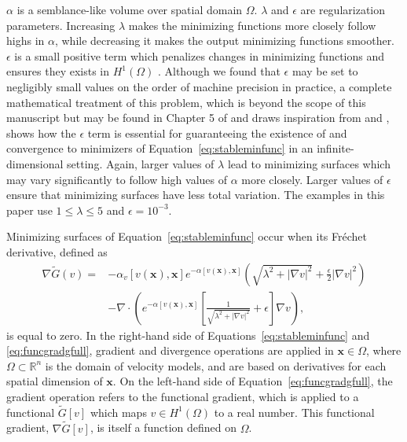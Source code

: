 $\alpha$ is a semblance-like volume over spatial domain $\Omega$.  $\lambda$ and $\epsilon$ are regularization parameters.  Increasing $\lambda$ makes the minimizing functions more closely follow highs in $\alpha$, while decreasing it makes the output minimizing functions smoother.  $\epsilon$ is a small positive term which penalizes changes in minimizing functions and ensures they exists in $H^1(\Omega)$ \cite[]{dobson-1997}.  Although we found that $\epsilon$ may be set to negligibly small values on the order of machine precision in practice, a complete mathematical treatment of this problem, which is beyond the scope of this manuscript but may be found in Chapter 5 of \cite{decker-dissertation} and draws inspiration from \cite{dacorogna2004introduction} and \cite{smyrlis-2004}, shows how the $\epsilon$ term is essential for guaranteeing the existence of and convergence to minimizers of  Equation~\ref{eq:stableminfunc} in an infinite-dimensional setting. Again, larger values of $\lambda$ lead to minimizing surfaces which may vary significantly to follow high values of $\alpha$ more closely. Larger values of $\epsilon$ ensure that minimizing surfaces have less total variation.  The examples in this paper use $1 \leq \lambda \leq 5$ and $\epsilon = 10^{-3}$. 

Minimizing surfaces of Equation~\ref{eq:stableminfunc} occur when its Fr\'{e}chet derivative, defined as
\begin{equation}
\label{eq:funcgradgfull}
\begin{split}
    \nabla \tilde{G}(v) =& -\alpha_v[v(\mathbf{x}),\mathbf{x}]e^{ -\alpha[v(\mathbf{x}),\mathbf{x}]}\left(\sqrt{\lambda^2+\left|\nabla v\right|^2}+\frac{\epsilon}{2}\left|\nabla v\right|^2 \right) \\
    &- \nabla \cdot \left(e^{-\alpha[v(\mathbf{x}),\mathbf{x}]}\left[\frac{1}{\sqrt{\lambda^2+\left|\nabla v\right|^2}}+\epsilon \right]\nabla v \right),
\end{split}
\end{equation}
is equal to zero. In the right-hand side of Equations~\ref{eq:stableminfunc} and \ref{eq:funcgradgfull}, gradient and divergence operations are applied in $\mathbf{x} \in \Omega$, where $\Omega \subset \mathbb{R}^n$ is the domain of velocity models, and are based on derivatives for each spatial dimension of $\mathbf{x}$.  On the left-hand side of Equation~\ref{eq:funcgradgfull}, the gradient operation refers to the functional gradient, which is applied to a functional $\tilde{G}[v]$ which maps $v \in H^1(\Omega)$ to a real number. This functional gradient, $\nabla \tilde{G}[v]$, is itself a function defined on $\Omega$.

